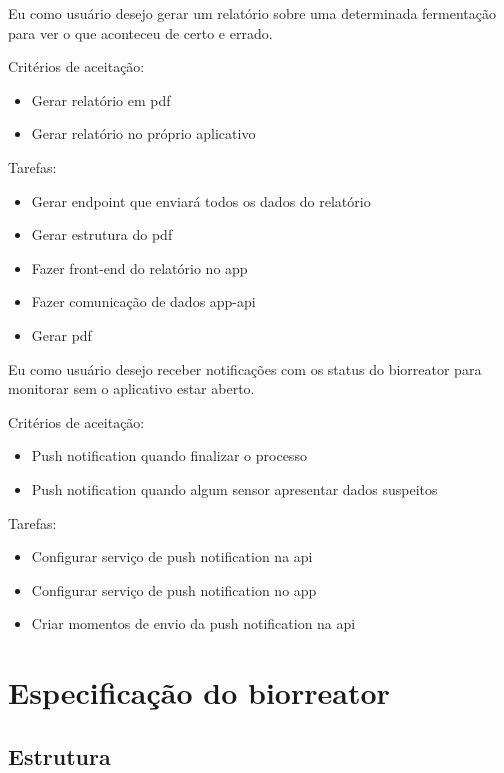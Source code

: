 
Eu como usuário desejo gerar um relatório sobre uma determinada fermentação para ver o que aconteceu de certo e errado.

Critérios de aceitação:
\begin{itemize}
  \item Gerar relatório em pdf
  \item Gerar relatório no próprio aplicativo
\end{itemize}

Tarefas:
\begin{itemize}
  \item Gerar endpoint que enviará todos os dados do relatório
  \item Gerar estrutura do pdf
  \item Fazer front-end do relatório no app
  \item Fazer comunicação de dados app-api
  \item Gerar pdf
\end{itemize}


Eu como usuário desejo receber notificações com os status do biorreator para monitorar sem o aplicativo estar aberto.

Critérios de aceitação:
\begin{itemize}
  \item Push notification quando finalizar o processo
  \item Push notification quando algum sensor apresentar dados suspeitos
\end{itemize}

Tarefas:
\begin{itemize}
  \item Configurar serviço de push notification na api
  \item Configurar serviço de push notification no app
  \item Criar momentos de envio da push notification na api
\end{itemize}

\section{Especificação do biorreator}

\subsection{Estrutura}

